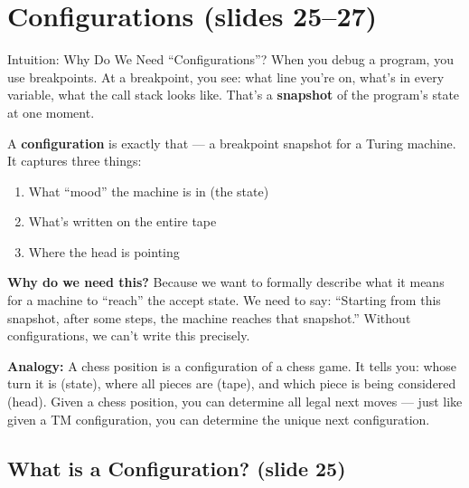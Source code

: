 \documentclass[11pt,a4paper]{article}
\begin{document}
\newpage
\section{Configurations (slides 25--27)}

\begin{conceptbox}{Intuition: Why Do We Need ``Configurations''?}
When you debug a program, you use breakpoints. At a breakpoint, you see: what line you're on, what's in every variable, what the call stack looks like. That's a \textbf{snapshot} of the program's state at one moment.

A \textbf{configuration} is exactly that --- a breakpoint snapshot for a Turing machine. It captures three things:
\begin{enumerate}[nosep]
\item What ``mood'' the machine is in (the state)
\item What's written on the entire tape
\item Where the head is pointing
\end{enumerate}

\textbf{Why do we need this?} Because we want to formally describe what it means for a machine to ``reach'' the accept state. We need to say: ``Starting from this snapshot, after some steps, the machine reaches that snapshot.'' Without configurations, we can't write this precisely.

\textbf{Analogy:} A chess position is a configuration of a chess game. It tells you: whose turn it is (state), where all pieces are (tape), and which piece is being considered (head). Given a chess position, you can determine all legal next moves --- just like given a TM configuration, you can determine the unique next configuration.
\end{conceptbox}

\subsection{What is a Configuration? (slide 25)}
\end{document}
